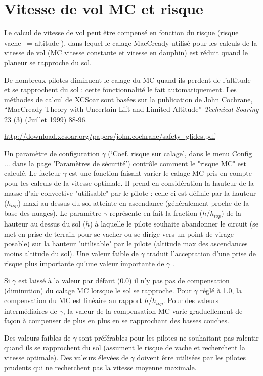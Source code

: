 \section{Vitesse de vol MC et risque}\label{sec:speed-fly-with}
Le calcul de vitesse de vol peut être compensé en fonction du risque (risque ~= vache  ~= altitude ), dans lequel le calage MacCready utilisé pour les calculs de la vitesse de vol (MC vitesse constante et vitesse en dauphin) est réduit quand le planeur se rapproche du sol.

De nombreux pilotes diminuent le calage du MC quand ils perdent de l'altitude et se rapprochent du sol : cette fonctionnalité le fait automatiquement. Les méthodes de calcul de XCSoar sont basées sur la publication de John  Cochrane, ``MacCready Theory with Uncertain Lift and Limited  Altitude'' {\em Technical Soaring} 23 (3) (Juillet 1999) 88-96.

\url{http://download.xcsoar.org/papers/john.cochrane/safety_glides.pdf}

Un paramètre de configuration $\gamma$ (`Coef. risque sur calage', dans le menu Config ... dans la page 'Paramètres de sécurité')  contrôle comment le "risque MC" est calculé. Le facteur $\gamma$ est une fonction faisant varier le calage MC pris en compte pour les calculs de la vitesse optimale. Il prend en considération la hauteur de la masse d'air convective "utilisable" par le pilote : celle-ci est définie par la hauteur ($h_{top}$) maxi au dessus du sol atteinte en ascendance (généralement proche de la base des nuages). Le paramètre $\gamma$ représente en fait la fraction ($h/h_{top}$) de la hauteur au dessus du sol  ($h$) à laquelle le pilote souhaite abandonner le circuit (se met en prise de terrain pour se vacher ou se dirige vers un point de virage posable) sur la hauteur "utilisable" par le pilote (altitude max des ascendances moins altitude du sol). Une valeur faible de $\gamma$  traduit l'acceptation d'une prise de risque plus importante qu'une valeur importante de  $\gamma$ .

Si  $\gamma$  est laissé à la valeur par défaut (0.0) il n'y pas pas de compensation (diminution) du calage MC lorsque le sol se rapproche. Pour  $\gamma$  réglé à 1.0, la compensation du MC est linéaire au rapport   $h/h_{top}$. Pour des valeurs intermédiaires de  $\gamma$, la valeur de la compensation MC varie graduellement de façon à compenser de plus en plus en se rapprochant des basses couches.

Des valeurs faibles de  $\gamma$  sont préférables pour les pilotes ne souhaitant pas ralentir quand ils se rapprochent du sol (assument le risque de vache et recherchent la vitesse optimale). Des valeurs élevées de  $\gamma$  doivent être utilisées par les pilotes prudents qui ne recherchent pas la vitesse moyenne maximale.

